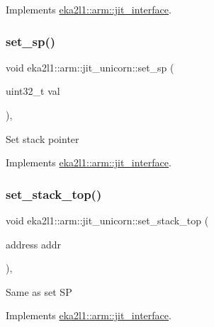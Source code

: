 Implements \mbox{\hyperlink{classeka2l1_1_1arm_1_1jit__interface_a49acadec0be00056abe923ed36a61bbd}{eka2l1\+::arm\+::jit\+\_\+interface}}.

\mbox{\label{classeka2l1_1_1arm_1_1jit__unicorn_a57b9a59b3deb69a66b85394280f15947}} 
\subsubsection{\texorpdfstring{set\+\_\+sp()}{set\_sp()}}
{\footnotesize\ttfamily void eka2l1\+::arm\+::jit\+\_\+unicorn\+::set\+\_\+sp (\begin{DoxyParamCaption}\item[{uint32\+\_\+t}]{val }\end{DoxyParamCaption})\hspace{0.3cm}{\ttfamily [override]}, {\ttfamily [virtual]}}

Set stack pointer 

Implements \mbox{\hyperlink{classeka2l1_1_1arm_1_1jit__interface_a8df41ca8e7ce3c72b3edaadf7bc1369b}{eka2l1\+::arm\+::jit\+\_\+interface}}.

\mbox{\label{classeka2l1_1_1arm_1_1jit__unicorn_a472a7da1849c941894cf684163fd0006}} 
\subsubsection{\texorpdfstring{set\+\_\+stack\+\_\+top()}{set\_stack\_top()}}
{\footnotesize\ttfamily void eka2l1\+::arm\+::jit\+\_\+unicorn\+::set\+\_\+stack\+\_\+top (\begin{DoxyParamCaption}\item[{address}]{addr }\end{DoxyParamCaption})\hspace{0.3cm}{\ttfamily [override]}, {\ttfamily [virtual]}}

Same as set SP 

Implements \mbox{\hyperlink{classeka2l1_1_1arm_1_1jit__interface_af0c5e6bd4d2df8069fbef45c92b72154}{eka2l1\+::arm\+::jit\+\_\+interface}}.

